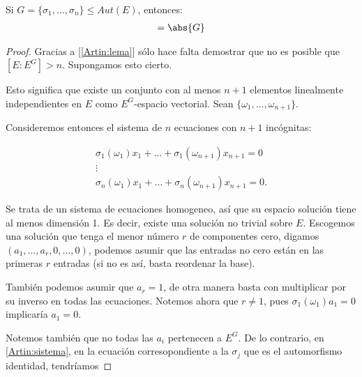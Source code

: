 

\begin{teorema}[Artin]
    Si $G=\{ \sigma_1, \dots, \sigma_n \} \leq Aut(E)$, entonces:
    \begin{align}
        [E : E^G]   =   \abs{G}
    \end{align}
\end{teorema}

\begin{proof}
    Gracias a [\ref{Artin:lema}] sólo hace falta demostrar que no es posible que $[E : E^G] > n$.
    Supongamos esto cierto.\par\null
        
    Esto significa que existe un conjunto con al menos $n+1$ elementos linealmente independientes en $E$ como
    $E^G$-espacio vectorial. Sean $\{ \omega_1, \dots, \omega_{n+1} \}$.\par\null
    
    Consideremos entonces el sistema de $n$ ecuaciones con $n+1$ incógnitas:
    
    \begin{align}\label{Artin:sistema}
        \sigma_1(\omega_1)x_1   +   \dots   +   \sigma_1(\omega_{n+1})x_{n+1}   =   0       \\
                                                                                    \vdots  \\
        \sigma_n(\omega_1)x_1   +   \dots   +   \sigma_n(\omega_{n+1})x_{n+1}   =   0.     
    \end{align}\par\null
    
    Se trata de un sistema de ecuaciones homogeneo, así que su espacio solución tiene al menos dimensión 1. 
    Es decir, existe una solución no trivial  sobre $E$. Escogemos una solución
    que tenga el menor número $r$ de componentes cero, digamos $(a_1, \dots, a_r, 0, \dots, 0)$, podemos
    asumir que las entradas no cero están en las primeras $r$ entradas (si no es así, basta reordenar la base).\par\null
    
    También podemos asumir que $a_r = 1$, de otra manera basta con multiplicar por su inverso en todas las ecuaciones.
    Notemos ahora que $r \not= 1$, pues $\sigma_1(\omega_1)a_1 = 0$ implicaría $a_1 = 0$.\par\null
    
    Notemos también que no todas las $a_i$ pertenecen a $E^G$. De lo contrario, en \eqref{Artin:sistema}, en la
    ecuación corresopondiente a la $\sigma_j$ que es el automorfismo identidad, tendríamos
    

\end{proof}
